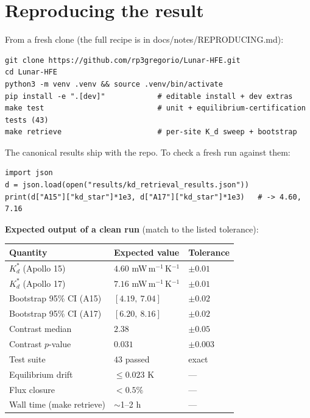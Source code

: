\documentclass[11pt]{report}
\newcommand{\code}[1]{{\ttfamily\small #1}}
\begin{document}
\medskip
{}

\appendix
\chapter{Reproducing the result}\label{app:repro}
From a fresh clone (the full recipe is in \code{docs/notes/REPRODUCING.md}):
\begin{lstlisting}[style=py]
git clone https://github.com/rp3gregorio/Lunar-HFE.git
cd Lunar-HFE
python3 -m venv .venv && source .venv/bin/activate
pip install -e ".[dev]"            # editable install + dev extras
make test                          # unit + equilibrium-certification tests (43)
make retrieve                      # per-site K_d sweep + bootstrap
\end{lstlisting}

\noindent The canonical results ship with the repo. To check a fresh run against
them:
\begin{lstlisting}[style=py]
import json
d = json.load(open("results/kd_retrieval_results.json"))
print(d["A15"]["kd_star"]*1e3, d["A17"]["kd_star"]*1e3)   # -> 4.60, 7.16
\end{lstlisting}

\noindent\textbf{Expected output of a clean run} (match to the listed tolerance):
\begin{center}\small
\begin{tabular}{@{}lll@{}}
\toprule
Quantity & Expected value & Tolerance \\
\midrule
$K_d^{*}$ (Apollo 15) & $4.60$ mW\,m$^{-1}$\,K$^{-1}$ & $\pm 0.01$ \\
$K_d^{*}$ (Apollo 17) & $7.16$ mW\,m$^{-1}$\,K$^{-1}$ & $\pm 0.01$ \\
Bootstrap 95\% CI (A15) & $[4.19,\ 7.04]$ & $\pm 0.02$ \\
Bootstrap 95\% CI (A17) & $[6.20,\ 8.16]$ & $\pm 0.02$ \\
Contrast median & $2.38$ & $\pm 0.05$ \\
Contrast $p$-value & $0.031$ & $\pm 0.003$ \\
Test suite & $43$ passed & exact \\
Equilibrium drift & $\le 0.023$ K & --- \\
Flux closure & $< 0.5\%$ & --- \\
Wall time (\code{make retrieve}) & $\sim$1--2 h & --- \\
\bottomrule
\end{tabular}
\end{center}
\end{document}
